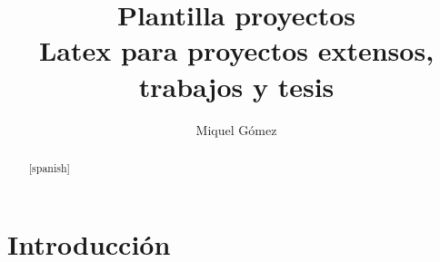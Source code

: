 \documentclass[11pt,spanish,listoffigures,listoftables]{tfgetsinf}
\title{Plantilla proyectos \\ Latex para proyectos extensos, trabajos y tesis}
\author{Miquel Gómez}
\begin{document}
 




\begin{abstract}[spanish]

\end{abstract}


\clearpage
\tableofcontents



\chapter{Introducción}
\end{document}
